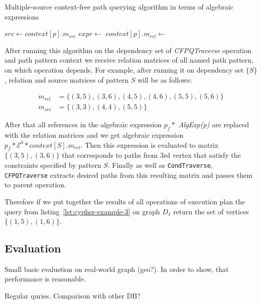 \begin{algorithm}
\begin{algorithmic}[1]
\caption{Multiple-source context-free path querying algorithm in terms of algebraic expressions}
\label{alg:redisgraph-cfpq}
        \State $src \gets context[p].m_{src}$
        \State $expr \gets$ 
        \State {}
        \State $context[p].m_{rel} \gets$ 
    \EndFor
\EndWhile

\EndFunction
\end{algorithmic}
\end{algorithm}

After running this algorithm on the dependency set of \textit{CFPQTraverse} operation and path pattern context we receive relation matrices of all named path pattern, on which operation depends. For example, after running it on dependency set $\{S\}$, relation and source matrices of pattern $S$ will be as follows:

\begin{align*}
m_{rel} &= \{(3, 5), (3, 6), (4, 5), (4, 6), (5, 5), (5, 6)\} \\
m_{src} &= \{(3, 3), (4, 4), (5, 5)\}
\end{align*}

After that all references in the algebraic expression $p_f *$ \textit{Alg\-Exp(p)} are replaced with the relation matrices and we get algebraic expression $p_f * \mathcal{E}^b * context[S].m_{rel}$. Then this expression is evaluated to matrix $\{(3, 5), (3, 6)\}$ that corresponds to paths from 3rd vertex that satisfy the constraints specified by pattern $S$. Finally as well as \lstinline{CondTraverse}, \lstinline{CFPQTraverse} extracts desired paths from this resulting matrix and passes them to parent operation.

Therefore if we put together the results of all operations of execution plan the query from listing~\ref{lst:cypher-example-3} on graph $D_1$ return the set of vertices $\{(1, 5), (1, 6)\}$.

\subsection{Evaluation}

Small basic evalustion on real-world graph (geo?).
In order to show, that performance is reasonable.

Regular quries. Comparison with other DB?


